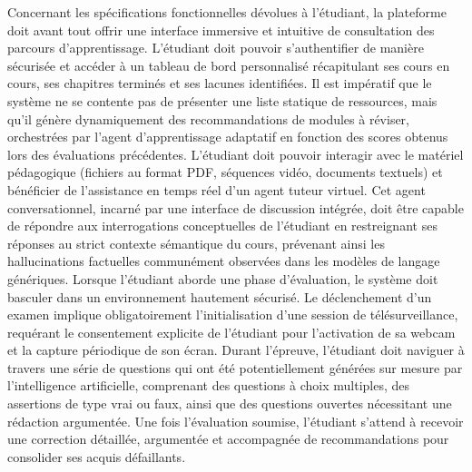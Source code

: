 Concernant les spécifications fonctionnelles dévolues à l'étudiant, la plateforme doit avant tout offrir une interface immersive et intuitive de consultation des parcours d'apprentissage. L'étudiant doit pouvoir s'authentifier de manière sécurisée et accéder à un tableau de bord personnalisé récapitulant ses cours en cours, ses chapitres terminés et ses lacunes identifiées. Il est impératif que le système ne se contente pas de présenter une liste statique de ressources, mais qu'il génère dynamiquement des recommandations de modules à réviser, orchestrées par l'agent d'apprentissage adaptatif en fonction des scores obtenus lors des évaluations précédentes. L'étudiant doit pouvoir interagir avec le matériel pédagogique (fichiers au format PDF, séquences vidéo, documents textuels) et bénéficier de l'assistance en temps réel d'un agent tuteur virtuel. Cet agent conversationnel, incarné par une interface de discussion intégrée, doit être capable de répondre aux interrogations conceptuelles de l'étudiant en restreignant ses réponses au strict contexte sémantique du cours, prévenant ainsi les hallucinations factuelles communément observées dans les modèles de langage génériques. Lorsque l'étudiant aborde une phase d'évaluation, le système doit basculer dans un environnement hautement sécurisé. Le déclenchement d'un examen implique obligatoirement l'initialisation d'une session de télésurveillance, requérant le consentement explicite de l'étudiant pour l'activation de sa webcam et la capture périodique de son écran. Durant l'épreuve, l'étudiant doit naviguer à travers une série de questions qui ont été potentiellement générées sur mesure par l'intelligence artificielle, comprenant des questions à choix multiples, des assertions de type vrai ou faux, ainsi que des questions ouvertes nécessitant une rédaction argumentée. Une fois l'évaluation soumise, l'étudiant s'attend à recevoir une correction détaillée, argumentée et accompagnée de recommandations pour consolider ses acquis défaillants.


